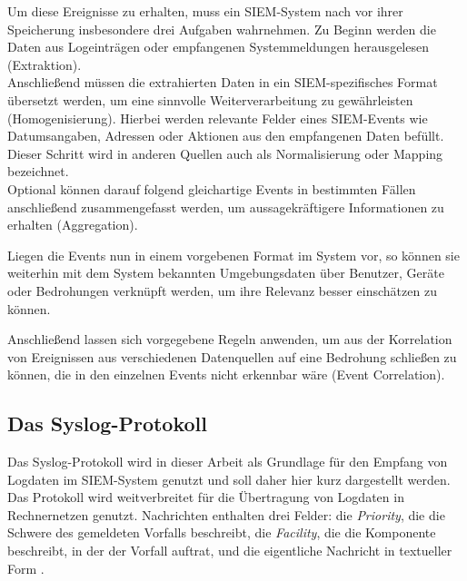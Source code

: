 Um diese Ereignisse zu erhalten, muss ein SIEM-System nach \cite{detken2014} vor ihrer Speicherung insbesondere drei Aufgaben wahrnehmen. Zu Beginn werden die Daten aus Logeinträgen oder empfangenen Systemmeldungen herausgelesen (Extraktion).\\
Anschließend müssen die extrahierten Daten in ein SIEM-spezifisches Format übersetzt werden, um eine sinnvolle Weiterverarbeitung zu gewährleisten (Homogenisierung). Hierbei werden relevante Felder eines SIEM-Events wie Datumsangaben, Adressen oder Aktionen aus den empfangenen Daten befüllt. Dieser Schritt wird in anderen Quellen auch als Normalisierung oder Mapping bezeichnet.\\
Optional können darauf folgend gleichartige Events in bestimmten Fällen anschließend zusammengefasst werden, um aussagekräftigere Informationen zu erhalten (Aggregation).

Liegen die Events nun in einem vorgebenen Format im System vor, so können sie weiterhin mit dem System bekannten Umgebungsdaten über Benutzer, Geräte oder Bedrohungen verknüpft werden, um ihre Relevanz besser einschätzen zu können. 

Anschließend lassen sich vorgegebene Regeln anwenden, um aus der Korrelation von Ereignissen aus verschiedenen Datenquellen auf eine Bedrohung schließen zu können, die in den einzelnen Events nicht erkennbar wäre (Event Correlation).


\subsection{Das Syslog-Protokoll}

\label{sec_basics_siem_syslog}

Das Syslog-Protokoll wird in dieser Arbeit als Grundlage für den Empfang von Logdaten im SIEM-System genutzt und soll daher hier kurz dargestellt werden. Das Protokoll wird weitverbreitet für die Übertragung von Logdaten in Rechnernetzen genutzt. Nachrichten enthalten drei Felder: die \textit{Priority}, die die Schwere des gemeldeten Vorfalls beschreibt, die \textit{Facility}, die die Komponente beschreibt, in der der Vorfall auftrat, und die eigentliche Nachricht in textueller Form \cite{rfc5424}.
